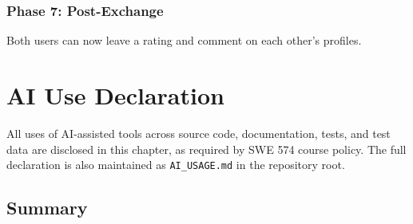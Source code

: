 \documentclass[11pt,a4paper]{report}
\begin{document}
\subsection{Phase 7: Post-Exchange}

Both users can now leave a rating and comment on each other's profiles.

\chapter{AI Use Declaration}

All uses of AI-assisted tools across source code, documentation, tests, and test data are disclosed in this chapter, as required by SWE 574 course policy. The full declaration is also maintained as \texttt{AI\_USAGE.md} in the repository root.

\section{Summary}
\end{document}
